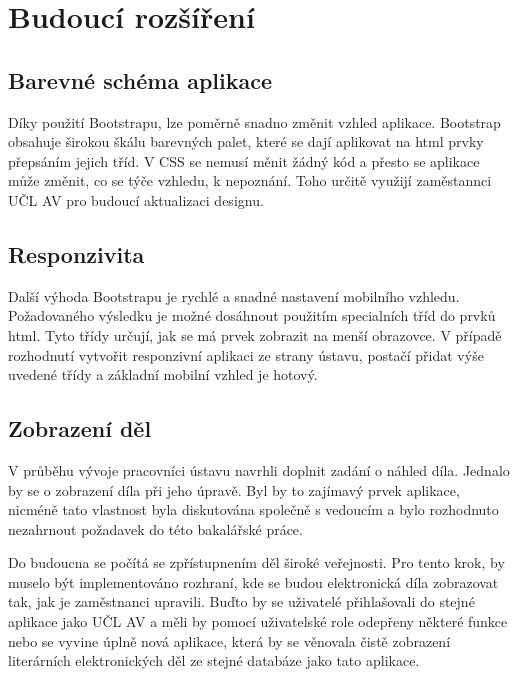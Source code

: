 
\chapter{Budoucí rozšíření}
    
    \section{Barevné schéma aplikace}
        Díky použití Bootstrapu, lze poměrně snadno změnit vzhled aplikace. Bootstrap obsahuje širokou škálu barevných palet, které se dají aplikovat na html prvky přepsáním jejich tříd. V CSS se nemusí měnit žádný kód a přesto se aplikace může změnit, co se týče vzhledu, k nepoznání. Toho určitě využijí zaměstannci UČL AV pro budoucí aktualizaci designu.
        
    \section{Responzivita}
        Další výhoda Bootstrapu je rychlé a snadné nastavení mobilního vzhledu. Požadovaného výsledku je možné dosáhnout použitím specialních tříd do prvků html. Tyto třídy určují, jak se má prvek zobrazit na menší obrazovce. V případě rozhodnutí vytvořit responzivní aplikaci ze strany ústavu, postačí přidat výše uvedené třídy a základní mobilní vzhled je hotový.
        
        
    \section{Zobrazení děl}
        V průběhu vývoje pracovníci ústavu navrhli doplnit zadání o náhled díla. Jednalo by se o zobrazení díla při jeho úpravě. Byl by to zajímavý prvek aplikace, nicméně tato vlastnost byla diskutována společně s vedoucím a bylo rozhodnuto nezahrnout požadavek do této bakalářské práce.
        
        Do budoucna se počítá se zpřístupnením děl široké veřejnosti. Pro tento krok, by muselo být implementováno rozhraní, kde se budou elektronická díla zobrazovat tak, jak je zaměstnanci upravili. Buďto by se uživatelé přihlašovali do stejné aplikace jako UČL AV a měli by pomocí uživatelské  role odepřeny některé funkce nebo se vyvine úplně nová aplikace, která by se věnovala čistě zobrazení literárních elektronických děl ze stejné databáze jako tato aplikace.
        
        
